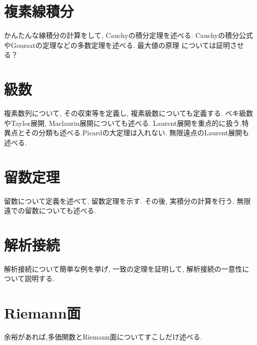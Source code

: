 \documentclass[a4j,dvipdfmx]{jsarticle}
\numberwithin{equation}{section}
\begin{document}
    \section{複素線積分}
        かんたんな線積分の計算をして, Cauchyの積分定理を述べる. Cauchyの積分公式やGoursatの定理などの多数定理を述べる. 最大値の原理
        については証明させる？
    \clearpage
    \section{級数}
        複素数列について, その収束等を定義し, 複素級数についても定義する. ベキ級数やTaylor展開, Maclaurin展開についても述べる.
        Laurent展開を重点的に扱う.特異点とその分類も述べる.Picardの大定理は入れない. 無限遠点のLaurent展開も述べる.
    \clearpage
    \section{留数定理}
        留数について定義を述べて, 留数定理を示す. その後, 実積分の計算を行う. 無限遠での留数についても述べる.
    \clearpage
    \section{解析接続}
        解析接続について簡単な例を挙げ, 一致の定理を証明して, 解析接続の一意性について説明する.
    \clearpage
    \section{Riemann面}
        余裕があれば,多価関数とRiemann面についてすこしだけ述べる.
    \clearpage
\end{document}
